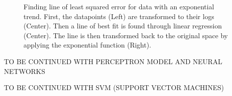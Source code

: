 \begin{figure}[!h]
\begin{subfigure}{0.32\textwidth}
    \end{subfigure}
  \caption{Finding line of least squared error for data with an exponential trend. First, the datapoints (Left) are transformed to their logs (Center). Then a line of best fit is found through linear regression (Center). The line is then transformed back to the original space by applying the exponential function (Right).}
  \label{fig:log_regression}
\end{figure}

TO BE CONTINUED WITH PERCEPTRON MODEL AND NEURAL NETWORKS

TO BE CONTINUED WITH SVM (SUPPORT VECTOR MACHINES)